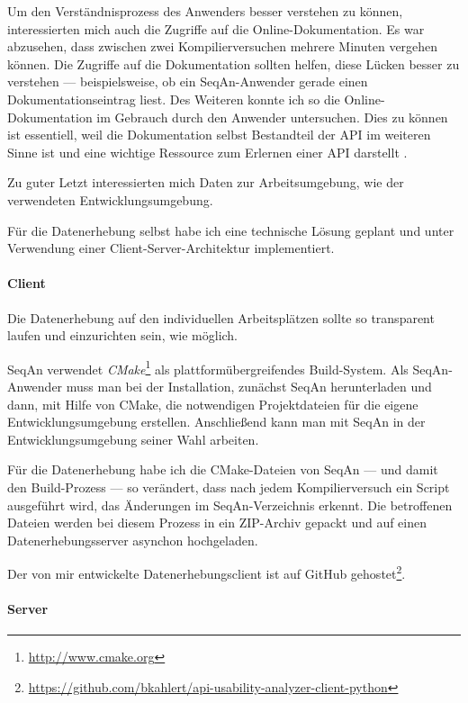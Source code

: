 Um den Verständnisprozess des Anwenders besser verstehen zu können, interessierten mich auch die Zugriffe auf die Online-Dokumentation. Es war abzusehen, dass zwischen zwei Kompilierversuchen mehrere Minuten vergehen können. Die Zugriffe auf die Dokumentation sollten helfen, diese Lücken besser zu verstehen --- beispielsweise, ob ein SeqAn-Anwender gerade einen Dokumentationseintrag liest. Des Weiteren konnte ich so die Online-Dokumentation im Gebrauch durch den Anwender untersuchen. Dies zu können ist essentiell, weil die Dokumentation selbst Bestandteil der API im weiteren Sinne ist und eine wichtige Ressource zum Erlernen einer API darstellt \citep{Robillard:2009cs,Robillard:2010bh}.

Zu guter Letzt interessierten mich Daten zur Arbeitsumgebung, wie der verwendeten Entwicklungsumgebung.

Für die Datenerhebung selbst habe ich eine technische Lösung geplant und unter Verwendung einer Client-Server-Architektur implementiert.


\paragraph{Client}
\label{sec:apiua-client}

Die Datenerhebung auf den individuellen Arbeitsplätzen sollte so transparent laufen und einzurichten sein, wie möglich. 

SeqAn verwendet \textit{CMake}\footnote{\url{http://www.cmake.org}} als plattformübergreifendes Build-System. Als SeqAn-Anwender muss man bei der Installation, zunächst SeqAn herunterladen und dann, mit Hilfe von CMake, die notwendigen Projektdateien für die eigene Entwicklungsumgebung erstellen. Anschließend kann man mit SeqAn in der Entwicklungsumgebung seiner Wahl arbeiten.

Für die Datenerhebung habe ich die CMake-Dateien von SeqAn --- und damit den Build-Prozess --- so verändert, dass nach jedem Kompilierversuch ein Script ausgeführt wird, das Änderungen im SeqAn-Verzeichnis erkennt. Die betroffenen Dateien werden bei diesem Prozess in ein ZIP-Archiv gepackt und auf einen Datenerhebungsserver asynchon hochgeladen.

Der von mir entwickelte Datenerhebungsclient ist auf GitHub gehostet\footnote{\url{https://github.com/bkahlert/api-usability-analyzer-client-python}}.

\paragraph{Server}
\label{sec:apiua-server}

